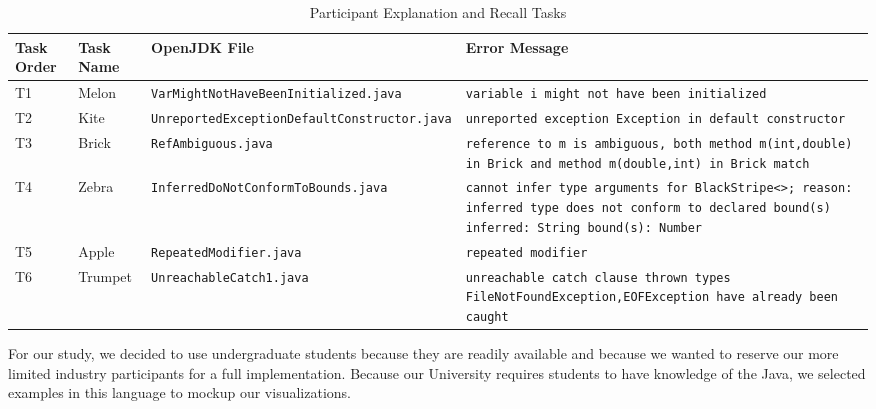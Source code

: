 \documentclass[conference]{IEEEtran}
\begin{document}
\begin{table}[!t]
\caption{Participant Explanation and Recall Tasks\label{tab:tasks}}
\centering
\begin{tabularx}{\textwidth}{lllX}
\toprule
Task Order & Task Name & OpenJDK File & Error Message\\
\midrule

T1 & Melon & \texttt{VarMightNotHaveBeenInitialized.java} & \texttt{variable i might not have been initialized} \\
[0.2cm]
\midrule

T2 & Kite & \texttt{UnreportedExceptionDefaultConstructor.java} & \texttt{unreported exception Exception in default constructor} \\
[0.2cm]
\midrule

T3 & Brick & \texttt{RefAmbiguous.java} & \texttt{reference to m is ambiguous, both method m(int,double) in Brick and method m(double,int) in Brick match}\\
[0.2cm]
\midrule

T4 & Zebra & \texttt{InferredDoNotConformToBounds.java} & \texttt{cannot infer type arguments for BlackStripe<>;\newline
reason: inferred type does not conform to declared bound(s)\newline\newline
inferred: String\newline
    bound(s): Number}\\
[0.2cm]
\midrule

T5 & Apple & \texttt{RepeatedModifier.java} & \texttt{repeated modifier
}\\
[0.2cm]
\midrule

T6 & Trumpet & \texttt{UnreachableCatch1.java} & \texttt{unreachable catch clause\newline     
  thrown types FileNotFoundException,EOFException have already been caught
}\\
[0.2cm]

\bottomrule
\end{tabularx}
\end{table}

For our study, we decided to use undergraduate students because they are readily available and because we wanted to reserve our more limited industry participants for a full implementation. Because our University requires students to have knowledge of the Java, we selected examples in this language to mockup our visualizations.
\end{document}
